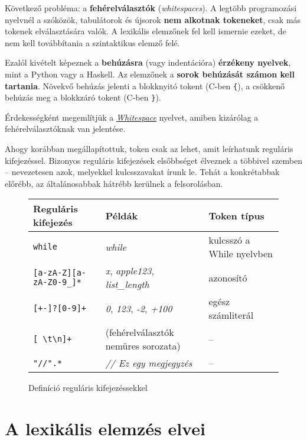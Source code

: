 Következő probléma: a \textbf{fehérelválasztók} (\textit{whitespaces}). A legtöbb programozási nyelvnél a szóközök, tabulátorok és újsorok \textbf{nem alkotnak tokeneket}, csak más tokenek elválasztására valók. A lexikális elemzőnek fel kell ismernie ezeket, de nem kell továbbítania a szintaktikus elemző felé.

Ezalól kivételt képeznek a \textbf{behúzásra} (vagy indentációra) \textbf{érzékeny nyelvek}, mint a Python vagy a Haskell. Az elemzőnek a \textbf{sorok behúzását számon kell tartania}. Növekvő behúzás jelenti a blokknyitó tokent (C-ben \texttt{\{}), a csökkenő behúzás meg a blokkzáró tokent (C-ben \texttt{\}}).

Érdekességként megemlítjük a \href{https://www.wikiwand.com/en/Whitespace\_(programming\_language)}{\textit{Whitespace}} nyelvet, amiben kizárólag a fehérelválasztóknak van jelentése.

Ahogy korábban megállapítottuk, token csak az lehet, amit leírhatunk reguláris kifejezéssel. Bizonyos reguláris kifejezések elsőbbséget élveznek a többivel szemben -- nevezetesen azok, melyekkel kulcsszavakat írunk le. Tehát a konkrétabbak előrébb, az általánosabbak hátrébb kerülnek a felsorolásban.

\begin{figure}[h!]
	\centering
	\begin{tabular}{l|ll}
		\textbf{Reguláris kifejezés} & \textbf{Példák} & \textbf{Token típus} \\
		\hline
		\texttt{while} & \textit{while} & kulcsszó a While nyelvben \\
		\texttt{[a-zA-Z][a-zA-Z0-9\_]*} & \textit{x}, \textit{apple123}, \textit{list\_length} & azonosító \\
		\texttt{[+-]?[0-9]+} & \textit{0}, \textit{123}, \textit{-2}, \textit{+100} & egész számliterál \\
		\texttt{[ \textbackslash t\textbackslash n]+} & (fehérelválasztók nemüres sorozata) & -- \\
		\texttt{"//".*} & \textit{// Ez egy megjegyzés} & -- \\
	\end{tabular}
	\caption{Definíció reguláris kifejezéssekkel}
\end{figure}

\section{A lexikális elemzés elvei}

